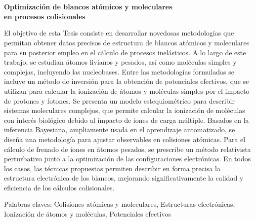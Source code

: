 \chapter*{}%
%

\vspace{-2cm}
\begin{center}
\begin{large}
\textbf{Optimización de blancos atómicos y moleculares \\ 
en procesos colisionales}
\end{large}
\end{center}

\vspace{1cm}
El objetivo de esta Tesis consiste en desarrollar novedosas metodologías 
que permitan 
obtener datos precisos de estructura de blancos atómicos y moleculares 
para su posterior empleo en el cálculo de procesos inelásticos. A lo 
largo de este trabajo, se estudian átomos livianos y pesados, así como 
moléculas simples y complejas, incluyendo las nucleobases. Entre las 
metodologías formuladas se incluye un método 
de inversión para la obtención de potenciales efectivos, que se utilizan 
para calcular la ionización de átomos y moléculas simples por el 
impacto de protones y fotones. Se presenta un modelo estequiométrico 
para describir sistemas moleculares complejos, que permite calcular la 
ionización de moléculas con interés biológico debido al impacto de iones 
de carga múltiple. Basados en la inferencia Bayesiana, ampliamente usada 
en el aprendizaje automatizado, se diseña una metodología para ajustar 
observables en colisiones atómicas. Para el 
cálculo de frenado de iones en átomos pesados, se prescribe un método 
relativista perturbativo junto a la optimización de las configuraciones
electrónicas. En todos los casos, las técnicas propuestas permiten 
describir en forma precisa la estructura electrónica de los blancos, 
mejorando significativamente la calidad y eficiencia de los cálculos 
colisionales.

\vspace{1cm}
\noindent
Palabras claves: 
Colisiones atómicas y moleculares, 
Estructuras electrónicas, 
Ionización de átomos y moléculas, 
Potenciales efectivos
